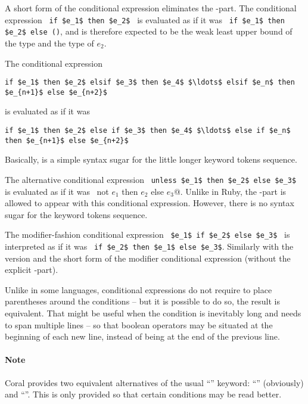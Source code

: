 A short form of the conditional expression eliminates the -part. The conditional expression ~\lstinline!if $e_1$ then $e_2$!~ is evaluated as if it was ~\lstinline!if $e_1$ then $e_2$ else ()!, and is therefore expected to be the weak least upper bound of the type  and the type of $e_2$. 

The conditional expression 
\begin{lstlisting}
if $e_1$ then $e_2$ elsif $e_3$ then $e_4$ $\ldots$ elsif $e_n$ then $e_{n+1}$ else $e_{n+2}$
\end{lstlisting} 
is evaluated as if it was 
\begin{lstlisting}
if $e_1$ then $e_2$ else if $e_3$ then $e_4$ $\ldots$ else if $e_n$ then $e_{n+1}$ else $e_{n+2}$
\end{lstlisting}
Basically,  is a simple syntax sugar for the little longer  keyword tokens sequence. 

The alternative conditional expression ~\lstinline!unless $e_1$ then $e_2$ else $e_3$!~ is evaluated as if it was ~\lstinline@if not $e_1$ then $e_2$ else $e_3$@. Unlike in Ruby, the -part is allowed to appear with this conditional expression. However, there is no syntax sugar for the  keyword tokens sequence. 

The modifier-fashion conditional expression ~\lstinline!$e_1$ if $e_2$ else $e_3$!~ is interpreted as if it was ~\lstinline!if $e_2$ then $e_1$ else $e_3$!. Similarly with the  version and the short form of the modifier conditional expression (without the explicit -part). 

Unlike in some languages, conditional expressions do not require to place parentheses around the conditions -- but it is possible to do so, the result is equivalent. That might be useful when the condition is inevitably long and needs to span multiple lines -- so that boolean operators may be situated at the beginning of each new line, instead of being at the end of the previous line. 

\paragraph{Note}
Coral provides two equivalent alternatives of the usual ``'' keyword: ``'' (obviously) and ``''. This is only provided so that certain conditions may be read better.

